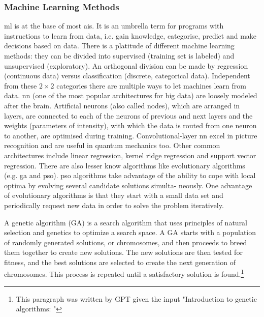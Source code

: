 \subsubsection{Machine Learning Methods}
%
%
\Gls{ml} is at the base of most \gls{ai}s.
It is an umbrella term for programs with instructions to learn from data, i.e. gain knowledge, categorise, predict and make decisions based on data. 
%
There is a platitude of different machine learning methods: 
they can be divided into supervised (training set is labeled) and unsupervised (exploratory).  
An orthogonal division can be made by regression (continuous data) versus classification (discrete, categorical data). 
Independent from these $2\times2$ categories there are multiple ways to let machines learn from data.
%
\Gls{nn} (one of the most popular architectures for big data\cite{Chiroma2019}) are loosely modeled after the brain\cite{bishop1994neural}.
Artificial neurons (also called nodes), which are arranged in layers, 
are connected to each of the neurons of previous and next layers
and the weights (parameters of intensity), with which the data is routed from one neuron to another, 
are optimised during training. 
%
Convolutional-layer \gls{nn} excel in picture recognition\cite{Lecun1995conv} and are useful in quantum mechanics too\cite{westermayr2020combining}.
Other common architectures include linear regression, kernel ridge regression and support vector regression.
There are also lesser know algorithms like 
evolutionary algorithms (e.g. \gls{ga} and \gls{pso}).
\gls{pso} algorithms take advantage of the ability to cope with local optima by evolving several candidate solutions simulta- neously\cite{villanova2010function}.
%
One advantage of evolutionary algorithms is that they start with a small data set
and periodically request new data in order to solve the problem iteratively.

A genetic algorithm (GA) is a search algorithm that uses principles of natural selection and genetics to optimize a search space. A GA starts with a population of randomly generated solutions, or chromosomes, and then proceeds to breed them together to create new solutions. The new solutions are then tested for fitness, and the best solutions are selected to create the next generation of chromosomes. This process is repeated until a satisfactory solution is found.\footnote{This paragraph was written by GPT\cite{Liu2021gpt} given the input "Introduction to genetic algorithms: "}

